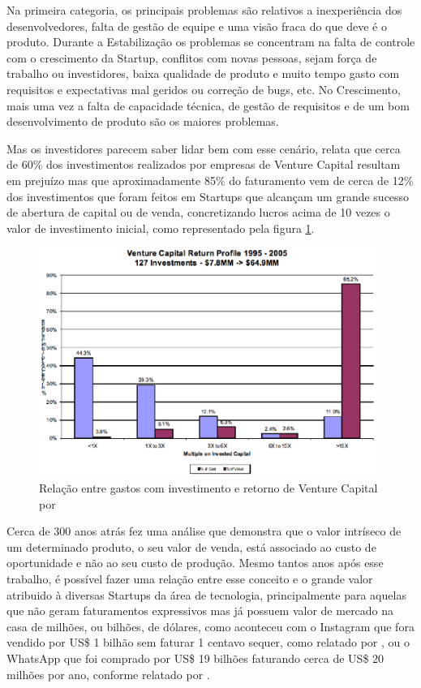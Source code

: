 Na primeira categoria, os principais problemas são relativos a inexperiência dos desenvolvedores, falta de gestão de equipe e uma visão fraca do que deve é o produto. Durante a Estabilização os problemas se concentram na falta de controle com o crescimento da Startup, conflitos com novas pessoas, sejam força de trabalho ou investidores, baixa qualidade de produto e muito tempo gasto com requisitos e expectativas mal geridos ou correção de bugs, etc. No Crescimento, mais uma vez a falta de capacidade técnica, de gestão de requisitos e de um bom desenvolvimento de produto são os maiores problemas.

Mas os investidores parecem saber lidar bem com esse cenário,  relata que cerca de 60\% dos investimentos realizados por empresas de Venture Capital resultam em prejuízo mas que aproximadamente 85\% do faturamento vem de cerca de 12\% dos investimentos que foram feitos em Startups que alcançam um grande sucesso de abertura de capital ou de venda, concretizando lucros acima de 10 vezes o valor de investimento inicial, como representado pela figura \ref{figure:venture_cpaital_profits}. 

\begin{figure}[!htb]
\centering
\includegraphics[width=11cm,angle=0]{figuras/venture_capital_profits}
\caption{Relação entre gastos com investimento e retorno de Venture Capital por \cite{Sahlman2010}}
\label{figure:venture_cpaital_profits}
\end{figure}

Cerca de 300 anos atrás  fez uma análise que demonstra que o valor intríseco de um determinado produto, o seu valor de venda, está associado ao custo de oportunidade e não ao seu custo de produção. Mesmo tantos anos após esse trabalho, é possível fazer uma relação entre esse conceito e o grande valor atribuido à diversas Startups da área de tecnologia, principalmente para aquelas que não geram faturamentos expressivos mas já possuem valor de mercado na casa de milhões, ou bilhões, de dólares, como aconteceu com o Instagram que fora vendido por US\$ 1 bilhão sem faturar 1 centavo sequer, como relatado por , ou o WhatsApp que foi comprado por US\$ 19 bilhões faturando cerca de US\$ 20 milhões por ano, conforme relatado por . 

